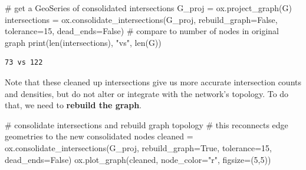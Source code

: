 \documentclass[
  letterpaper,
  DIV=11,
  numbers=noendperiod]{scrreprt}
\newenvironment{Shaded}{\begin{snugshade}}{\end{snugshade}}
\newcommand{\BuiltInTok}[1]{\textcolor[rgb]{0.00,0.23,0.31}{#1}}
\newcommand{\CommentTok}[1]{\textcolor[rgb]{0.37,0.37,0.37}{#1}}
\newcommand{\DecValTok}[1]{\textcolor[rgb]{0.68,0.00,0.00}{#1}}
\newcommand{\NormalTok}[1]{\textcolor[rgb]{0.00,0.23,0.31}{#1}}
\newcommand{\OperatorTok}[1]{\textcolor[rgb]{0.37,0.37,0.37}{#1}}
\newcommand{\StringTok}[1]{\textcolor[rgb]{0.13,0.47,0.30}{#1}}
\newcommand{\VariableTok}[1]{\textcolor[rgb]{0.07,0.07,0.07}{#1}}
\begin{document}
\begin{Shaded}
\begin{Highlighting}[]
\CommentTok{\# get a GeoSeries of consolidated intersections}
\NormalTok{G\_proj }\OperatorTok{=}\NormalTok{ ox.project\_graph(G)}
\NormalTok{intersections }\OperatorTok{=}\NormalTok{ ox.consolidate\_intersections(G\_proj, rebuild\_graph}\OperatorTok{=}\VariableTok{False}\NormalTok{, tolerance}\OperatorTok{=}\DecValTok{15}\NormalTok{, dead\_ends}\OperatorTok{=}\VariableTok{False}\NormalTok{)}
\CommentTok{\# compare to number of nodes in original graph}
\BuiltInTok{print}\NormalTok{(}\BuiltInTok{len}\NormalTok{(intersections), }\StringTok{"vs"}\NormalTok{, }\BuiltInTok{len}\NormalTok{(G))}
\end{Highlighting}
\end{Shaded}

\begin{verbatim}
73 vs 122
\end{verbatim}

Note that these cleaned up intersections give us more accurate
intersection counts and densities, but do not alter or integrate with
the network's topology. To do that, we need to \textbf{rebuild the
graph}.

\begin{Shaded}
\begin{Highlighting}[]
\CommentTok{\# consolidate intersections and rebuild graph topology}
\CommentTok{\# this reconnects edge geometries to the new consolidated nodes}
\NormalTok{cleaned }\OperatorTok{=}\NormalTok{ ox.consolidate\_intersections(G\_proj, rebuild\_graph}\OperatorTok{=}\VariableTok{True}\NormalTok{, tolerance}\OperatorTok{=}\DecValTok{15}\NormalTok{, dead\_ends}\OperatorTok{=}\VariableTok{False}\NormalTok{)}
\NormalTok{ox.plot\_graph(cleaned, node\_color}\OperatorTok{=}\StringTok{"r"}\NormalTok{, figsize}\OperatorTok{=}\NormalTok{(}\DecValTok{5}\NormalTok{,}\DecValTok{5}\NormalTok{))}
\end{Highlighting}
\end{Shaded}
\end{document}

